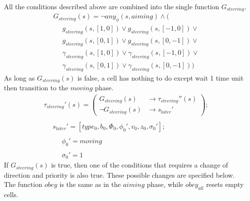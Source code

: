 \documentclass{acm_proc_article-sp}
\begin{document}
All the conditions described above are combined into 
the single function $G_{steering}$.
\begin{displaymath} \begin{array}{l}
G_{steering}(s) = \neg any_{\phi}(s, aiming) \wedge ( \\
\hspace{16pt} g_{steering}(s, [1, 0]) \vee g_{steering}(s, [-1, 0]) \vee \\
\hspace{16pt} g_{steering}(s, [0, 1]) \vee g_{steering}(s, [0, -1]) \vee \\
\hspace{16pt} \gamma_{steering}(s, [1, 0]) \vee \gamma_{steering}(s, [-1, 0]) \vee \\
\hspace{16pt} \gamma_{steering}(s, [0, 1]) \vee \gamma_{steering}(s, [0, -1]))
\end{array} \end{displaymath}
As long as $G_{steering}(s)$ is false, a cell has nothing
to do except wait 1 time unit then transition to the 
$moving$ phase.
\begin{displaymath} \begin{array}{l}
\tau_{steering}'(s) = \left( \begin{array}{ll} G_{steering}(s)      & \rightarrow \tau_{steering}''(s) \\
                                               \neg G_{steering}(s) & \rightarrow s_{later}' \end{array} \right); \\
\\
\hspace{16pt} s_{later}' = [type_0, b_0, \Phi_0, \phi_0', v_0, z_0, \sigma_0']; \\
\\
\hspace{16pt} \hspace{16pt} \phi_0' = moving \\
\\
\hspace{16pt} \hspace{16pt} \sigma_0' = 1 
\end{array} \end{displaymath}
If $G_{steering}(s)$ is true, then one of the conditions 
that requires a change of direction and priority is also
true.  These possible changes are specified below.  The 
function $obey$ is the same as in the $aiming$ phase,
while $obey_{all}$ resets empty cells.
\end{document}
